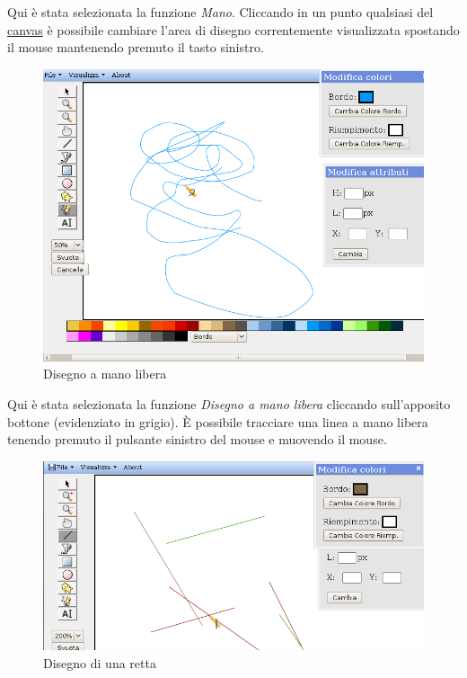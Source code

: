 \vspace{100pt}
Qui \`e stata selezionata la funzione \textit{Mano}. Cliccando in un punto qualsiasi del \underline{canvas} \`e possibile cambiare l'area di disegno correntemente visualizzata spostando il mouse mantenendo premuto il tasto sinistro.
\newpage 

\begin{figure}[!ht]
\centering
\includegraphics[scale=0.5]{images/matita.png}
\caption{Disegno a mano libera}
\end{figure} 


\vspace{100pt}
Qui \`e stata selezionata la funzione \textit{Disegno a mano libera} cliccando sull'apposito bottone (evidenziato in grigio). \`E possibile tracciare una linea a mano libera tenendo premuto il pulsante sinistro del mouse e muovendo il mouse.
\newpage

\begin{figure}[!ht]
\centering
\includegraphics[scale=0.5]{images/linea.png}
\caption{Disegno di una retta}
\end{figure} 


